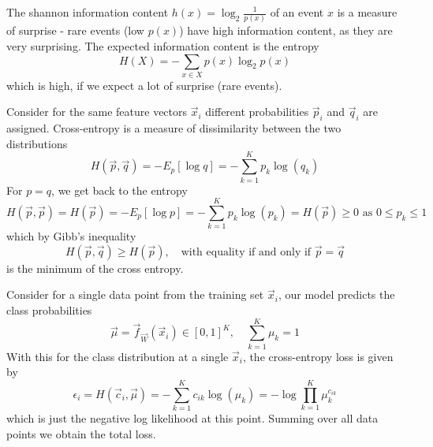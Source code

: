The shannon information content $h(x) = \log_2 \frac{1}{p(x)}$ of an event $x$
is a measure of surprise - rare events (low $p(x)$) have high information content,
as they are very surprising. The expected information content is the entropy
\begin{equation}
    H(X) = -\sum_{x \in X} p(x) \log_2 p(x)
\end{equation}
which is high, if we expect a lot of surprise (rare events).

Consider for the same feature vectors $\vec{x}_i$ different probabilities $\vec{p}_i$ and $\vec{q}_i$
are assigned. Cross-entropy is a measure of dissimilarity between the two distributions
\begin{equation}
    H(\vec{p}, \vec{q}) = -E_p[\log{q}] =-\sum_{k=1}^K p_k \log(q_k)
\end{equation}
For $p = q$, we get back to the entropy
\begin{equation}
    H(\vec{p}, \vec{p}) = H(\vec{p}) = -E_p[\log{p}] =-\sum_{k=1}^K p_k \log(p_k) = H(\vec{p}) \geq 0 \text{ as } 0 \leq p_k \leq 1
\end{equation}
which by Gibb's inequality
\begin{equation}
    H(\vec{p}, \vec{q}) \geq H(\vec{p}), \quad \text{with equality if and only if } \vec{p} = \vec{q}
\end{equation}
is the minimum of the cross entropy.

Consider for a single data point from the training set $\vec{x}_i$, our model
predicts the class probabilities
\begin{equation}
    \vec{\mu} = \vec{f}_\vec{W}(\vec{x}_i) \in [0,1]^K, \quad \sum_{k=1}^K \mu_k = 1
\end{equation}
With this for the class distribution at a single $\vec{x}_i$, the cross-entropy loss is given by
\begin{equation}
    \epsilon_i = H(\vec{c}_i, \vec{\mu}) = -\sum_{k=1}^K c_{ik} \log(\mu_k) = -\log \prod_{k=1}^K \mu_k^{c_{ik}}
\end{equation}
which is just the negative log likelihood at this point. Summing over all data points
we obtain the total loss.

\pagebreak